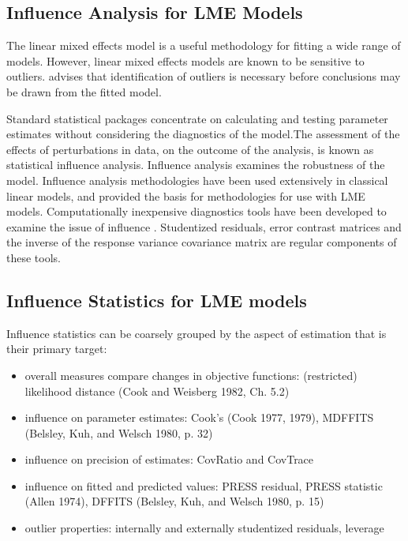 \documentclass[12pt, a4paper]{article}
\begin{document}
	\newpage
	\subsection{Influence Analysis for LME Models} %
	The linear mixed effects model is a useful methodology for fitting a wide range of models. However, linear mixed effects models are known to be sensitive to outliers. \citet{CPJ} advises that identification of outliers is necessary before conclusions may be drawn from the fitted model.
	
	Standard statistical packages concentrate on calculating and testing parameter estimates without considering the diagnostics of the model.The assessment of the effects of perturbations in data, on the outcome of the analysis, is known as statistical influence analysis. Influence analysis examines the robustness of the model. Influence analysis methodologies have been used extensively in classical linear models, and provided the basis for methodologies for use with LME models.
	Computationally inexpensive diagnostics tools have been developed to examine the issue of influence \citep{Zewotir}.
	Studentized residuals, error contrast matrices and the inverse of the response variance covariance matrix are regular components of these tools.
	
	\subsection{Influence Statistics for LME models} %
	Influence statistics can be coarsely grouped by the aspect of estimation that is their primary target:
	\begin{itemize}
		\item overall measures compare changes in objective functions: (restricted) likelihood distance (Cook and Weisberg 1982, Ch. 5.2)
		\item influence on parameter estimates: Cook's  (Cook 1977, 1979), MDFFITS (Belsley, Kuh, and Welsch 1980, p. 32)
		\item influence on precision of estimates: CovRatio and CovTrace
		\item influence on fitted and predicted values: PRESS residual, PRESS statistic (Allen 1974), DFFITS (Belsley, Kuh, and Welsch 1980, p. 15)
		\item outlier properties: internally and externally studentized residuals, leverage
	\end{itemize}
	
\end{document}
